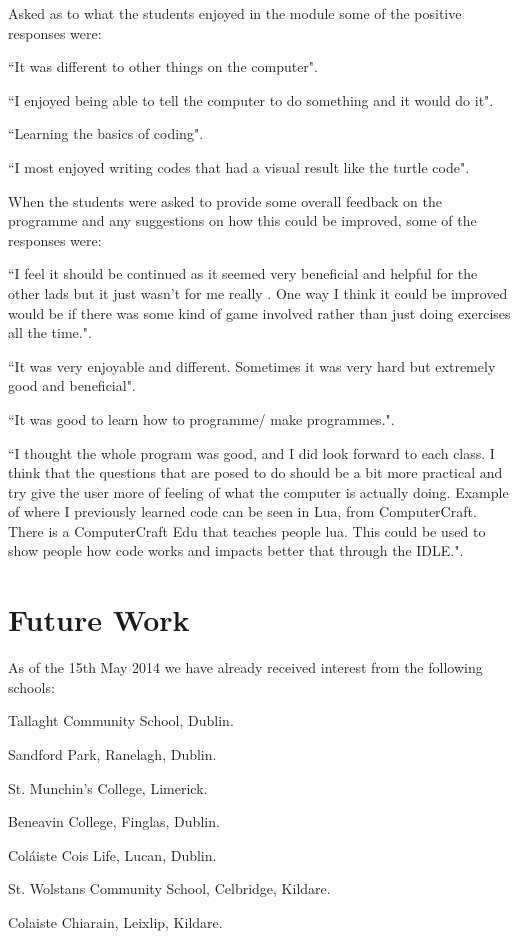 \documentclass[a4paper]{article}
\begin{document}
Asked as to what the students enjoyed in the module some of the positive responses were:

\begin{compactitem}
  \item ``It was different to other things on the computer". 
  \item ``I enjoyed being able to tell the computer to do something and it would do it".
  \item ``Learning the basics of coding".
  \item ``I most enjoyed writing codes that had a visual result like the turtle code".
\end{compactitem}  

When the students were asked to provide some overall feedback on the programme and any suggestions on how this could be improved, some of the responses were:

\begin{compactitem}
  \item ``I feel it should be continued as it seemed very beneficial and helpful for the other lads but it just wasn't for me really . One way I think it could be improved would be if there was some kind of game involved rather than just doing exercises all the time.". 
  \item ``It was very enjoyable and different. Sometimes it was very hard but extremely good and beneficial".
  \item ``It was good to learn how to programme/ make programmes.".
  \item ``I thought the whole program was good, and I did look forward to each class. I think that the questions that are posed to do should be a bit more practical and try give the user more of feeling of what the computer is actually doing. Example of where I previously learned code can be seen in Lua, from ComputerCraft. There is a ComputerCraft Edu that teaches people lua. This could be used to show people how code works and impacts better that through the IDLE.".
\end{compactitem}  


\section{Future Work}
As of the 15th May 2014 we have already received interest from the following schools:
\begin{compactitem}
  \item Tallaght Community School, Dublin. 
  \item Sandford Park, Ranelagh, Dublin.
  \item St. Munchin's College, Limerick.
  \item Beneavin College, Finglas, Dublin.
  \item Coláiste Cois Life, Lucan, Dublin.
  \item St. Wolstans Community School, Celbridge, Kildare. 
  \item Colaiste Chiarain, Leixlip, Kildare. 
\end{compactitem}  
\end{document}
